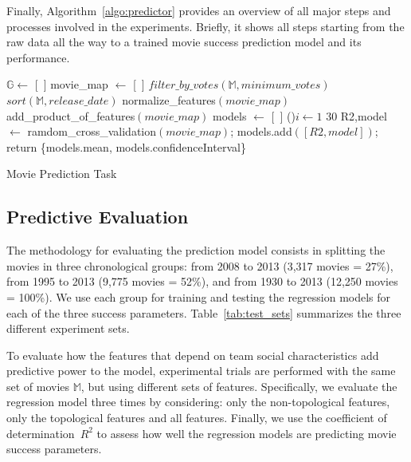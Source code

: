 Finally, Algorithm~\ref{algo:predictor} provides an overview of all major steps
and processes involved in the experiments. Briefly, it shows all steps starting
from the raw data all the way to a trained movie success prediction model and
its performance.

\begin{algorithm}[tb]
    $\mathbb{G} \leftarrow$ [~] 
    movie\_map $\leftarrow$ [~] 
    $filter\_by\_votes(\mathbb{M}, minimum\_votes)$\;
    $sort(\mathbb{M}, release\_date)$\; 
    normalize\_features$(movie\_map)$\;
    add\_product\_of\_features$(movie\_map)$\;
    models $\leftarrow$ [~] 		
    \For(){$i\leftarrow 1$ \KwTo{} $30$}{
        R2,model $\leftarrow$ ramdom\_cross\_validation$(movie\_map)$;
        models.add$([R2, model])$;
    }
    return \{models.mean, models.confidenceInterval\}\;
\caption{Movie Prediction Task}\label{algo:predictor}
\end{algorithm}



\subsection{Predictive Evaluation}
\label{sub:predictive_evaluation}
The methodology for evaluating the prediction model consists in 
splitting the movies in three chronological groups: from 2008 to
2013 (3,317 movies = 27\%), from 1995 to 2013 (9,775 movies = 52\%), and from
1930 to 2013 (12,250 movies = 100\%). We use each group for
training and testing the regression models for each of the three success
parameters. Table~\ref{tab:test_sets} summarizes the three different experiment
sets.

To evaluate how the features that depend on team social characteristics add
predictive power to the model, experimental trials are performed with the same
set of movies $\mathbb{M}$, but using different sets of features. Specifically,
we evaluate the regression model three times by considering: only the
non-topological features, only the topological features and all features.
Finally, we use the coefficient of determination~$R^2$ to assess how well the
regression models are predicting movie success parameters.

